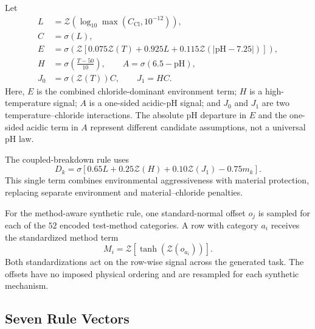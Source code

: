 \documentclass{article}
\begin{document}
Let
\begin{align}
L&=\mathcal{Z}\!\left(\log_{10}\max(C_{\mathrm{Cl}},10^{-12})\right),\\
C&=\sigma(L),\\
E&=\sigma\!\left(\mathcal{Z}\!\left[
 0.075\mathcal{Z}(T)+0.925L+0.115\mathcal{Z}(|\mathrm{pH}-7.25|)
\right]\right),\\
H&=\sigma\!\left(\frac{T-50}{10}\right),\qquad
A=\sigma(6.5-\mathrm{pH}),\\
J_0&=\sigma(\mathcal{Z}(T))C,\qquad J_1=HC.
\label{eq:rule-environment-signals}
\end{align}
Here, \(E\) is the combined chloride-dominant environment term; \(H\) is
a high-temperature signal; \(A\) is a one-sided acidic-pH signal; and
\(J_0\) and \(J_1\) are two temperature--chloride interactions. The
absolute pH departure in \(E\) and the one-sided acidic term in \(A\)
represent different candidate assumptions, not a universal pH law.

The coupled-breakdown rule uses
\begin{equation}
D_k=\sigma\!\left[
0.65L+0.25\mathcal{Z}(H)+0.10\mathcal{Z}(J_1)-0.75m_k
\right].
\label{eq:rule-coupled}
\end{equation}
This single term combines environmental aggressiveness with material
protection, replacing separate environment and material--chloride penalties.

For the method-aware synthetic rule, one standard-normal offset \(o_j\) is
sampled for each of the \(52\) encoded test-method categories. A row with
category \(a_i\) receives the standardized method term
\begin{equation}
M_i=\mathcal{Z}\!\left[\tanh\!\left(\mathcal{Z}(o_{a_i})\right)\right].
\label{eq:rule-method}
\end{equation}
Both standardizations act on the row-wise signal across the generated task.
The offsets have no imposed physical ordering and are resampled for each
synthetic mechanism.

\subsection{Seven Rule Vectors}
\end{document}
